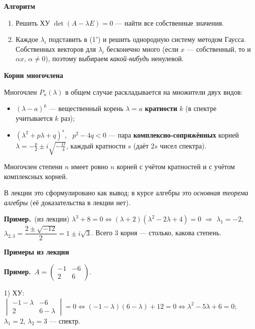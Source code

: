 \documentclass[a4paper,11pt]{article}
\newcommand{\prim}{\par\smallskip\noindent\textbf{\textcolor{teoc!80!black}{Пример.}}\ }
\newcommand{\podr}[1]{\par\needspace{8\baselineskip}\medskip
  {\large\bfseries\textcolor{oprc!80!black}{#1}}\par\nopagebreak\smallskip}
\begin{document}
\podr{Алгоритм}

\begin{enumerate}[leftmargin=*]
  \item Решить ХУ $\det(A - \lambda E) = 0$ --- найти все собственные значения.
  \item Каждое $\lambda_i$ подставить в (1$'$) и решить однородную систему методом Гаусса.
        Собственных векторов для $\lambda_i$ бесконечно много (если $x$ --- собственный, то и $\alpha x$, $\alpha \ne 0$),
        поэтому выбираем \emph{какой-нибудь} ненулевой.
\end{enumerate}

\podr{Корни многочлена}

Многочлен $P_n(\lambda)$ в общем случае раскладывается на множители двух видов:
\begin{itemize}[leftmargin=*]
  \item $(\lambda - a)^k$ --- вещественный корень $\lambda = a$ \textbf{кратности} $k$ (в спектре учитывается $k$ раз);
  \item $(\lambda^2 + p\lambda + q)^s$, \ $p^2 - 4q < 0$ --- пара \textbf{комплексно-сопряжённых} корней
        $\lambda = -\frac p2 \pm i\sqrt{-\frac D4}$, каждый кратности $s$ (даёт $2s$ чисел спектра).
\end{itemize}

\begin{teo}
Многочлен степени $n$ имеет ровно $n$ корней с учётом кратностей и с учётом комплексных корней.
\end{teo}

{\small\textcolor{zamc}{В лекции это сформулировано как вывод; в курсе алгебры это \emph{основная теорема алгебры}
(её доказательства в лекции нет).}}

\prim (из лекции) $\lambda^3 + 8 = 0 \Leftrightarrow (\lambda + 2)(\lambda^2 - 2\lambda + 4) = 0$ $\Rightarrow$
$\lambda_1 = -2$, \ $\lambda_{2,3} = \dfrac{2 \pm \sqrt{-12}}{2} = 1 \pm i\sqrt3$. Всего 3 корня --- столько, какова степень.

\podr{Примеры из лекции}

\prim $A = \begin{pmatrix} -1 & -6 \\ 2 & 6 \end{pmatrix}$.

1) ХУ: $\begin{vmatrix} -1 - \lambda & -6 \\ 2 & 6 - \lambda \end{vmatrix} = 0 \Leftrightarrow (-1 - \lambda)(6 - \lambda) + 12 = 0
\Leftrightarrow \lambda^2 - 5\lambda + 6 = 0$; \ $\lambda_1 = 2$, $\lambda_2 = 3$ --- спектр.
\end{document}
